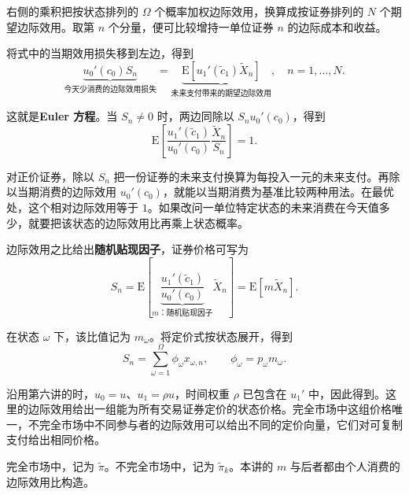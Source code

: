 右侧的乘积把按状态排列的 $\Omega$ 个概率加权边际效用，换算成按证券排列的 $N$ 个期望边际效用。取第 $n$ 个分量，便可比较增持一单位证券 $n$ 的边际成本和收益。

\begin{tcolorbox}[knowledge,title=Euler 方程]
将式中的当期效用损失移到左边，得到
\begin{equation}
 \underbrace{u_0'(c_0)S_n}_{\text{今天少消费的边际效用损失}}
 =\underbrace{\mathrm E[u_1'(\tilde c_1)\widetilde X_n]}_{\text{未来支付带来的期望边际效用}},
 \quad n=1,\ldots,N.\label{eq:wj-8-2}
\end{equation}

这就是\textbf{Euler 方程}。当 $S_n\ne0$ 时，两边同除以 $S_nu_0'(c_0)$，得到
\begin{equation}
 \mathrm E\left[\frac{u_1'(\tilde c_1)}{u_0'(c_0)}
                 \frac{\widetilde X_n}{S_n}\right]=1.\label{eq:wj-8-3}
\end{equation}
\end{tcolorbox}

对正价证券，除以 $S_n$ 把一份证券的未来支付换算为每投入一元的未来支付。再除以当期消费的边际效用 $u_0'(c_0)$，就能以当期消费为基准比较两种用法。在最优处，这个相对边际效用等于 $1$。如果改问一单位特定状态的未来消费在今天值多少，就要把该状态的边际效用比再乘上状态概率。

\hypertarget{wj-stochastic-discount-factor}{}
\begin{tcolorbox}[knowledge,title=随机贴现因子与状态价格]
边际效用之比给出\textbf{随机贴现因子}，证券价格可写为
\[
 S_n=\mathrm E\!\left[
 \underbrace{\frac{u_1'(\tilde c_1)}{u_0'(c_0)}}_{m\text{：随机贴现因子}}
 \widetilde X_n\right]
 =\mathrm E[m\widetilde X_n].
\]

在状态 $\omega$ 下，该比值记为 $m_\omega$。将定价式按状态展开，得到
\[
 S_n=\sum_{\omega=1}^{\Omega}\phi_\omega x_{\omega,n},
 \qquad \phi_\omega=p_\omega m_\omega.
\]
\end{tcolorbox}

沿用第六讲的时，$u_0=u$、$u_1=\rho u$，时间权重 $\rho$ 已包含在 $u_1'$ 中，因此得到。这里的边际效用给出一组能为所有交易证券定价的状态价格。完全市场中这组价格唯一，不完全市场中不同参与者的边际效用可以给出不同的定价向量，它们对可复制支付给出相同价格。

完全市场中，记为 $\widetilde\pi$。不完全市场中，记为 $\widetilde\pi_k$。本讲的 $m$ 与后者都由个人消费的边际效用比构造。

